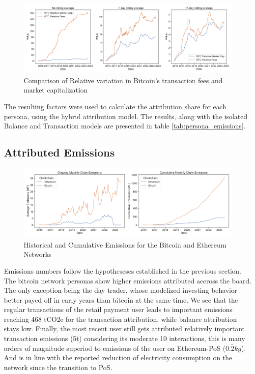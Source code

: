 \documentclass[11pt]{report}
\begin{document}
\begin{figure}[h!]
    \centering
    \centerline{\includegraphics[scale=0.4]{figures/btc_avg_tx_fee.png}}
    \caption{Comparison of Relative variation in Bitcoin's transaction fees and market capitalization}
    \label{fig:comparison_fees_cap}
\end{figure}

The resulting factors were used to calculate the attribution share for each persona, using the hybrid attribution model. The results, along with the isolated Balance and Transaction models are presented in table \ref{tab:persona_emissions}.

\subsection{Attributed Emissions}




\begin{figure}[h!]
    \centering
    \centerline{\includegraphics[scale=0.4]{figures/ongoing_cumulative_emissions.png}}
    \caption{Historical and Cumulative Emissions for the Bitcoin and Ethereum Networks}
    \label{fig:ongoing_emissions}
\end{figure}

Emissions numbers follow the hypotheseses established in the previous section. The bitcoin network personas show higher emissions attributed accross the board. The only exception being the day trader, whose modelized investing behavior better payed off in early years than bitcoin at the same time. We see that the regular transactions of the retail payment user leads to important emissions reaching 468 tCO2e for the transaction attribution, while balance attribution stays low. Finally, the most recent user still gets attributed relatively important transaction emissions (5t) considering its moderate 10 interactions, this is many orders of magnitude superiod to emissions of the user on Ethereum-PoS ($\tilde{0.2kg}$). And is in line with the reported reduction of electricity consumption on the network since the transition to PoS.
\end{document}

